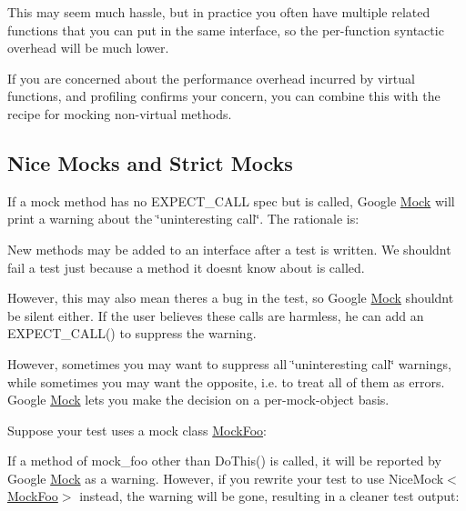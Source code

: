 This may seem much hassle, but in practice you often have multiple related functions that you can put in the same interface, so the per-\/function syntactic overhead will be much lower.

If you are concerned about the performance overhead incurred by virtual functions, and profiling confirms your concern, you can combine this with the recipe for mocking non-\/virtual methods.

\subsection*{Nice Mocks and Strict Mocks}

If a mock method has no {\ttfamily E\+X\+P\+E\+C\+T\+\_\+\+C\+A\+LL} spec but is called, Google \mbox{\hyperlink{class_mock}{Mock}} will print a warning about the \char`\"{}uninteresting call\char`\"{}. The rationale is\+:


\begin{DoxyItemize}
\item New methods may be added to an interface after a test is written. We shouldn\textquotesingle{}t fail a test just because a method it doesn\textquotesingle{}t know about is called.
\item However, this may also mean there\textquotesingle{}s a bug in the test, so Google \mbox{\hyperlink{class_mock}{Mock}} shouldn\textquotesingle{}t be silent either. If the user believes these calls are harmless, he can add an {\ttfamily E\+X\+P\+E\+C\+T\+\_\+\+C\+A\+L\+L()} to suppress the warning.
\end{DoxyItemize}

However, sometimes you may want to suppress all \char`\"{}uninteresting call\char`\"{} warnings, while sometimes you may want the opposite, i.\+e. to treat all of them as errors. Google \mbox{\hyperlink{class_mock}{Mock}} lets you make the decision on a per-\/mock-\/object basis.

Suppose your test uses a mock class {\ttfamily \mbox{\hyperlink{class_mock_foo}{Mock\+Foo}}}\+:


\begin{DoxyCode}{0}
\DoxyCodeLine{\}}
\end{DoxyCode}


If a method of {\ttfamily mock\+\_\+foo} other than {\ttfamily Do\+This()} is called, it will be reported by Google \mbox{\hyperlink{class_mock}{Mock}} as a warning. However, if you rewrite your test to use {\ttfamily Nice\+Mock$<$\mbox{\hyperlink{class_mock_foo}{Mock\+Foo}}$>$} instead, the warning will be gone, resulting in a cleaner test output\+:


